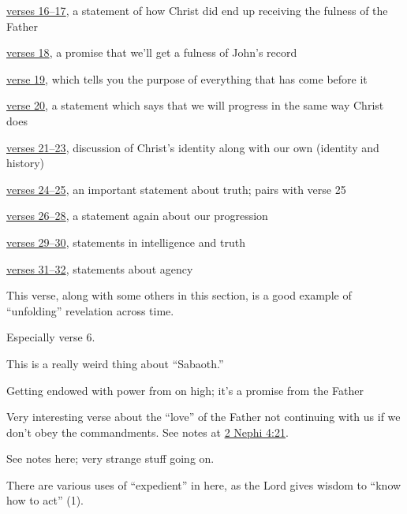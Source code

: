 \begin{compactdesc}
\begin{compactitem}
					\item \hyperref[DC93-16]{verses 16--17}, a statement of how Christ did end up receiving the fulness of the Father
					\item \hyperref[DC93-18]{verses 18}, a promise that we'll get a fulness of John's record 
					\item \hyperref[DC93-19]{verse 19}, which tells you the purpose of everything that has come before it
					\item \hyperref[DC93-20]{verse 20}, a statement which says that we will progress in the same way Christ does
					\item \hyperref[DC93-21]{verses 21--23}, discussion of Christ's identity along with our own (identity and history)
					\item \hyperref[DC93-24]{verses 24--25}, an important statement about truth; pairs with verse 25
					\item \hyperref[DC93-26]{verses 26--28}, a statement again about our progression
					\item \hyperref[DC93-29]{verses 29--30}, statements in intelligence and truth
					\item \hyperref[DC93-31]{verses 31--32}, statements about agency
				\end{compactitem}
			\item[{\hyperref[DC94-17]{DC 94:17}}] This verse, along with some others in this section, is a good example of ``unfolding'' revelation across time. 
			\item[{\hyperref[DC95]{DC 95}}]
				\begin{compactitem}
					\item[{\hyperref[DC95-1]{DC 95:1--6}}] Especially verse 6.
					\item[{\hyperref[DC95-7]{DC 95:7}}] This is a really weird thing about ``Sabaoth.''
					\item[{\hyperref[DC95-8]{DC 95:8--9}}] Getting endowed with power from on high; it's a promise from the Father
					\item[{\hyperref[DC95-12]{DC 95:12}}] Very interesting verse about the ``love'' of the Father not continuing with us if we don't obey the commandments. See notes at \hyperref[2NEPHI-4-21]{2 Nephi 4:21}.
					\item[{\hyperref[DC95-17]{DC 95:17}}] See notes here; very strange stuff going on.
				\end{compactitem}
			\item[{\hyperref[DC96]{DC 96}}] There are various uses of ``expedient'' in here, as the Lord gives wisdom to ``know how to act'' (1).

\end{compactdesc}
